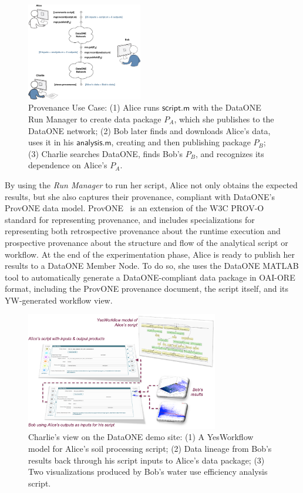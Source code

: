 \documentclass[a4paper]{llncs}
\newcommand{\code}[1]{\ensuremath{\mathsf{#1}}}
\begin{document}
\begin{figure}[t]  
\centering 
\includegraphics[width=0.45\textwidth]{alice-bob-charlie-sequence-crop} \caption{Provenance Use Case: (1) Alice runs \code{script.m} with the DataONE Run Manager to create data package $P_A$, which she publishes to the DataONE network; (2) Bob later finds and downloads Alice's data, uses it in his \code{analysis.m}, creating and then publishing package $P_B$; (3) Charlie searches DataONE, finds Bob's $P_B$, and recognizes its dependence on Alice's $P_A$.}  \label{fig0} 
\end{figure}

By using the \emph{Run Manager} to run her script, Alice not only obtains the expected results, but she also captures their provenance, compliant with DataONE's ProvONE data model. 
ProvONE~\cite{provone} is an extension of the W3C PROV-O~\cite{prov-o} standard for representing provenance, and includes specializations for representing both retrospective provenance about the runtime execution and prospective provenance about the structure and flow of the analytical script or workflow.
%
At the end of the experimentation phase, Alice is ready to publish her results to a DataONE Member Node.  To do so, she uses the DataONE MATLAB tool to automatically generate a DataONE-compliant data package in OAI-ORE format, including the ProvONE provenance document, the script itself, and its YW-generated workflow view.


\begin{figure}[h]
\centering   
\includegraphics[width=0.75\textwidth]{abc-crop}
\caption{Charlie's view on the DataONE demo site: (1) A YesWorkflow model for Alice's soil processing script; (2) Data lineage from Bob's results back through his script inputs to Alice's data package; (3) Two visualizations produced by Bob's water use efficiency analysis script.}
\label{fig2}
\end{figure}
\end{document}
